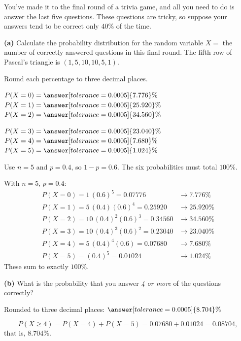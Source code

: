 \documentclass[12pt]{ximera}
\begin{document}
\begin{problem}
You've made it to the final round of a trivia game, and all you need to do is answer
the last five questions. These questions are tricky, so suppose your answers tend to
be correct only $40\%$ of the time.

\begin{prompt}
\textbf{(a)} Calculate the probability distribution for the random variable
$X=$ the number of correctly answered questions in this final round. The fifth row of
Pascal's triangle is $(1,5,10,10,5,1)$.

Round each percentage to three decimal places.

$P(X=0)=\answer[tolerance=0.0005]{7.776}\%$ \qquad
$P(X=1)=\answer[tolerance=0.0005]{25.920}\%$ \qquad
$P(X=2)=\answer[tolerance=0.0005]{34.560}\%$

\smallskip
$P(X=3)=\answer[tolerance=0.0005]{23.040}\%$ \qquad
$P(X=4)=\answer[tolerance=0.0005]{7.680}\%$ \qquad
$P(X=5)=\answer[tolerance=0.0005]{1.024}\%$

\begin{hint}
Use $n=5$ and $p=0.4$, so $1-p=0.6$. The six probabilities must total $100\%$.
\end{hint}

\begin{feedback}
With $n=5$, $p=0.4$:
\[
\begin{array}{ll}
P(X=0)=1\,(0.6)^5=0.07776 & \to 7.776\%\\
P(X=1)=5\,(0.4)(0.6)^4=0.25920 & \to 25.920\%\\
P(X=2)=10\,(0.4)^2(0.6)^3=0.34560 & \to 34.560\%\\
P(X=3)=10\,(0.4)^3(0.6)^2=0.23040 & \to 23.040\%\\
P(X=4)=5\,(0.4)^4(0.6)=0.07680 & \to 7.680\%\\
P(X=5)=(0.4)^5=0.01024 & \to 1.024\%
\end{array}
\]
These sum to exactly $100\%$. \checkmark
\end{feedback}
\end{prompt}

\begin{prompt}
\textbf{(b)} What is the probability that you answer \emph{4 or more} of the
questions correctly?

Rounded to three decimal places: $\answer[tolerance=0.0005]{8.704}\%$

\begin{feedback}
\[
P(X\ge 4)=P(X=4)+P(X=5)=0.07680+0.01024=0.08704,
\]
that is, $8.704\%$.
\end{feedback}
\end{prompt}


\end{problem}
\end{document}
